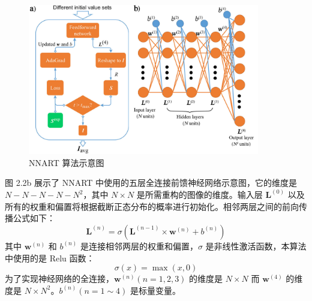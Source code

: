 \begin{figure}[htbp]
	\vspace{\baselineskip}
	\centering
	\includegraphics[width=0.9\textwidth]{../3.2/32}
	\caption{NNART 算法示意图}\label{fig:32}
	\song{}
\end{figure}

图 2.2b 展示了 NNART 中使用的五层全连接前馈神经网络示意图，它的维度是 $N-N-N-N-N^2$，其中 $N\times N$ 是所需重构的图像的维度。输入层 $\boldsymbol{L}^{(0)}$ 以及所有的权重和偏置将根据截断正态分布的概率进行初始化。相邻两层之间的前向传播公式如下：
\begin{equation}
	\boldsymbol{L}^{(n)}= \sigma \left(\boldsymbol{L}^{(n-1)}\times \boldsymbol{w}^{(n)} + b^{(n)}\right)
\end{equation}
其中 $\boldsymbol{w}^{(n)}$ 和 $b^{(n)}$ 是连接相邻两层的权重和偏置，$\sigma$ 是非线性激活函数，本算法中使用的是 Relu 函数：
\begin{equation}
\sigma(x)= \max(x,0)
\end{equation}
为了实现神经网络的全连接，$\boldsymbol{w}^{(n)}(n = 1, 2, 3)$ 的维度是 $N\times N$ 而 $\boldsymbol{w}^{(4)}$ 的维度是 $N\times N^2$。$b^{(n)} (n = 1\sim 4)$ 是标量变量。

